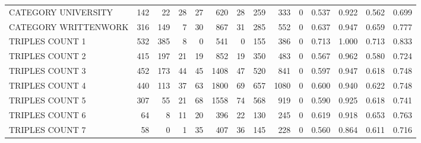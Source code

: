 \begin{tabular}{lrrrrrrrrrllll}
 CATEGORY UNIVERSITY      &             142 &            22 &              28 &              27 &             620 &   28 &  259 &  333 &    0 & 0.537 & 0.922 & 0.562 & 0.699 \\
 CATEGORY WRITTENWORK     &             316 &           149 &               7 &              30 &             867 &   31 &  285 &  552 &    0 & 0.637 & 0.947 & 0.659 & 0.777 \\
 TRIPLES COUNT 1          &             532 &           385 &               8 &               0 &             541 &    0 &  155 &  386 &    0 & 0.713 & 1.000 & 0.713 & 0.833 \\
 TRIPLES COUNT 2          &             415 &           197 &              21 &              19 &             852 &   19 &  350 &  483 &    0 & 0.567 & 0.962 & 0.580 & 0.724 \\
 TRIPLES COUNT 3          &             452 &           173 &              44 &              45 &            1408 &   47 &  520 &  841 &    0 & 0.597 & 0.947 & 0.618 & 0.748 \\
 TRIPLES COUNT 4          &             440 &           113 &              37 &              63 &            1800 &   69 &  657 & 1080 &    0 & 0.600 & 0.940 & 0.622 & 0.748 \\
 TRIPLES COUNT 5          &             307 &            55 &              21 &              68 &            1558 &   74 &  568 &  919 &    0 & 0.590 & 0.925 & 0.618 & 0.741 \\
 TRIPLES COUNT 6          &              64 &             8 &              11 &              20 &             396 &   22 &  130 &  245 &    0 & 0.619 & 0.918 & 0.653 & 0.763 \\
 TRIPLES COUNT 7          &              58 &             0 &               1 &              35 &             407 &   36 &  145 &  228 &    0 & 0.560 & 0.864 & 0.611 & 0.716 \\
\hline
\end{tabular}